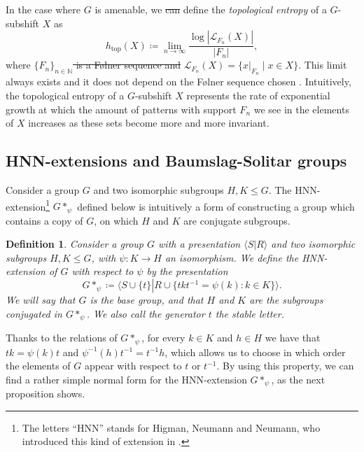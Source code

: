 \documentclass[cupthm,crop,info]{CUP-JNL-ETS}%
\theoremstyle{cupplain}
\theoremstyle{cupdefinition}
\newtheorem{definition}{Definition}[section]
\theoremstyle{cupremark}
\theoremstyle{cupproof}
\numberwithin{equation}{section}
\def\htop{h_{\mathrm{top}}}
\providecommand{\DIFadd}[1]{{\protect\color{blue}\uwave{#1}}} %
\providecommand{\DIFdel}[1]{{\protect\color{red}\sout{#1}}}                      %
\providecommand{\DIFaddbegin}{} %
\providecommand{\DIFaddend}{} %
\providecommand{\DIFdelbegin}{} %
\providecommand{\DIFdelend}{} %
\newcommand{\DIFscaledelfig}{0.5}
\newlength{\DIFdelgraphicswidth} %
\newlength{\DIFdelgraphicsheight} %
\newcommand{\DIFaddincludegraphics}[2][]{{\color{blue}\fbox{\DIFOincludegraphics[#1]{#2}}}} %
\newcommand{\DIFdelincludegraphics}[2][]{%
\sbox{\DIFdelgraphicsbox}{\DIFOincludegraphics[#1]{#2}}%
\settoboxwidth{\DIFdelgraphicswidth}{\DIFdelgraphicsbox} %
\settoboxtotalheight{\DIFdelgraphicsheight}{\DIFdelgraphicsbox} %
\scalebox{\DIFscaledelfig}{%
\parbox[b]{\DIFdelgraphicswidth}{\usebox{\DIFdelgraphicsbox}\\[-\baselineskip] \rule{\DIFdelgraphicswidth}{0em}}\llap{\resizebox{\DIFdelgraphicswidth}{\DIFdelgraphicsheight}{%
\setlength{\unitlength}{\DIFdelgraphicswidth}%
\begin{picture}(1,1)%
\thicklines\linethickness{2pt} %
{\color[rgb]{1,0,0}\put(0,0){\framebox(1,1){}}}%
{\color[rgb]{1,0,0}\put(0,0){\line( 1,1){1}}}%
{\color[rgb]{1,0,0}\put(0,1){\line(1,-1){1}}}%
\end{picture}%
}\hspace*{3pt}}} %
} %
\DeclareRobustCommand{\DIFaddbegin}{\DIFOaddbegin \let\includegraphics\DIFaddincludegraphics} %
\DeclareRobustCommand{\DIFaddend}{\DIFOaddend \let\includegraphics\DIFOincludegraphics} %
\DeclareRobustCommand{\DIFdelbegin}{\DIFOdelbegin \let\includegraphics\DIFdelincludegraphics} %
\DeclareRobustCommand{\DIFdelend}{\DIFOaddend \let\includegraphics\DIFOincludegraphics} %
\begin{document}
\DIFaddend In the case where $G$ is amenable, we \DIFdelbegin \DIFdel{can }\DIFdelend \DIFaddbegin \DIFadd{fix a F\o lner sequence $\{F_n\}_{n\in \mathbb{N}}$ and we }\DIFaddend define the \textit{topological entropy} of a $G$-subshift $X$ as
$$
\htop(X)\coloneqq \lim_{n\to \infty}\frac{\log|\mathcal{L}_{F_n}(X)|}{|F_n|},
$$
where  \DIFdelbegin \DIFdel{$\{F_n\}_{n\in \mathbb{N}}$ is a F\o lner sequence and }\DIFdelend $\mathcal{L}_{F_n}(X)=\{x|_{F_n}\mid x\in X\}$. This limit always exists and it does not depend on the F\o lner sequence chosen \cite[Theorem~4.38]{Kerr2016}. Intuitively, the topological entropy of a $G$-subshift $X$ represents the rate of exponential growth at which the amount of patterns with support $F_n$ we see in the elements of $X$ increases as these sets become more and more invariant.


\subsection{HNN-extensions and Baumslag-Solitar groups}
Consider a group $G$ and two isomorphic subgroups $H,K\le G$. The HNN-extension\footnote{The letters ``HNN'' stands for Higman, Neumann and Neumann, who introduced this kind of extension in \cite{HNN49}.} $G*_{\psi}$ defined below is intuitively a form of constructing a group which contains a copy of $G$, on which $H$ and $K$ are conjugate subgroups.

\begin{definition}\label{definition.hnn_extension} Consider a group $G$ with a presentation $\langle S\left|\right. R\rangle$ and two isomorphic subgroups $H,K\le G$, with $\psi:K\to H$ an isomorphism. We define the \textit{HNN-extension} of $G$ with respect to $\psi$ by the presentation
	$$
	G*_{\psi}\coloneqq \langle S\cup\{t\} \left|\right. R\cup \{t k t^{-1}=\psi(k): k\in K \} \rangle.
	$$
	We will say that $G$ is the \textit{base group}, and that $H$ and $K$ are the subgroups conjugated in $G*_{\psi}$. We also call the generator $t$ the \textit{stable letter}.
\end{definition}
Thanks to the relations of $G*_{\psi}$, for every $k\in K$ and $h\in H$ we have that $tk=\psi(k)t$ and $\psi^{-1}(h)t^{-1}=t^{-1}h$, which allows us to choose in which order the elements of $G$ appear with respect to $t$ or $t^{-1}$. By using this property, we can find a rather simple normal form for the HNN-extension $G*_{\psi}$, as the next proposition shows.
\end{document}
